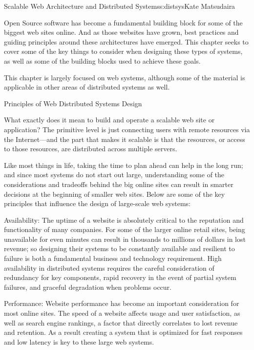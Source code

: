 \begin{aosachapter}{Scalable Web Architecture and Distributed Systems}{s:distsys}{Kate Matsudaira}

Open Source software has become a fundamental building block for some
of the biggest web sites online. And as those websites have grown,
best practices and guiding principles around these architectures have
emerged. This chapter seeks to cover some of the key things to
consider when designing these types of systems, as well as some of the
building blocks used to achieve these goals.

This chapter is largely focused on web systems, although some of the
material is applicable in other areas of distributed systems as well.

\begin{aosasect1}{Principles of Web Distributed Systems Design}

What exactly does it mean to build and operate a scalable web site or
application? The primitive level is just connecting users with remote
resources via the Internet---and the part that makes it scalable is
that the resources, or access to those resources, are distributed
across multiple servers.

Like most things in life, taking the time to plan ahead can help in
the long run; and since most systems do not start out large,
understanding some of the considerations and tradeoffs behind the big
online sites can result in smarter decisions at the beginning of
smaller web sites. Below are some of the key principles that influence
the design of large-scale web systems:

\begin{aosadescription}

\item{Availability:} The uptime of a website is absolutely critical to
  the reputation and functionality of many companies. For some of the
  larger online retail sites, being unavailable for even minutes can
  result in thousands to millions of dollars in lost revenue; so
  designing their systems to be constantly available and resilient to
  failure is both a fundamental business and technology
  requirement. High availability in distributed systems requires the
  careful consideration of redundancy for key components, rapid
  recovery in the event of partial system failures, and graceful
  degradation when problems occur.

\item{Performance:} Website performance has become an important
  consideration for most online sites. The speed of a website affects
  usage and user satisfaction, as well as search engine rankings, a
  factor that directly correlates to lost revenue and retention. As a
  result creating a system that is optimized for fast responses and
  low latency is key to these large web systems.


\end{aosadescription}
\end{aosasect1}
\end{aosachapter}
